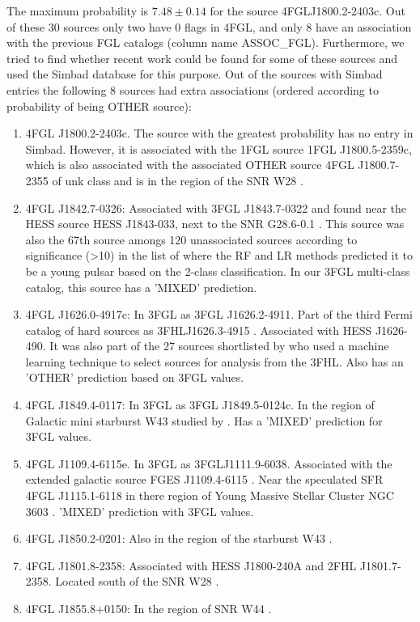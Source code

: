 The maximum probability is $7.48\pm0.14$ for the source 4FGLJ1800.2-2403c. Out of these 30 sources only two have 0 flags in 4FGL, and only 8 have an association with the previous FGL catalogs (column name ASSOC\_FGL). Furthermore, we tried to find whether recent work could be found for some of these sources and used the Simbad database for this purpose. Out of the sources with Simbad entries the following 8 sources had extra associations (ordered according to probability of being OTHER source):
\begin{enumerate}
\item 4FGL J1800.2-2403c. The source with the greatest probability has no entry in Simbad. However, it is associated with the 1FGL source 1FGL J1800.5-2359c, which is also associated with the associated OTHER source 4FGL J1800.7-2355 of unk class and is in the region of the SNR W28 \citep{2020MNRAS.495.2909R}.
\item 4FGL J1842.7-0326: Associated with 3FGL J1843.7-0322 and found near the HESS source HESS J1843-033, next to the SNR G28.6-0.1 \citep{2018A&A...612A...1H}. This source was also the 67th source amongs 120 unassociated sources according to significance (>10) in the list of \citet{2016ApJ...820....8S} where the RF and LR methods predicted it to be a young pulsar based on the 2-class classification. In our 3FGL multi-class catalog, this source has a 'MIXED' prediction.
\item 4FGL J1626.0-4917c: In 3FGL as 3FGL J1626.2-4911. Part of the third Fermi catalog of hard sources as 3FHLJ1626.3-4915 \citep{2017ApJS..232...18A}. Associated with HESS J1626-490. It was also part of the 27 sources shortlisted by \citet{2020MNRAS.495.1093H} who used a machine learning technique to select sources for analysis from the 3FHL. Also has an 'OTHER' prediction based on 3FGL values.
\item 4FGL J1849.4-0117: In 3FGL as 3FGL J1849.5-0124c. In the region of Galactic mini starburst W43 studied by \citet{2020A&A...640A..60Y}. Has a 'MIXED' prediction for 3FGL values.
\item 4FGL J1109.4-6115e. In 3FGL as 3FGLJ1111.9-6038. Associated with the extended galactic source FGES J1109.4-6115 \citep{2017ApJ...843..139A}. Near the speculated SFR 4FGL J1115.1-6118 in there region of  Young Massive Stellar Cluster NGC 3603 \citep{2020ApJ...897..131S}. 'MIXED' prediction with 3FGL values.
\item 4FGL J1850.2-0201: Also in the region of the starburst W43 \citep{2020A&A...640A..60Y}.
\item 4FGL J1801.8-2358: Associated with HESS J1800-240A and 2FHL J1801.7-2358. Located south of the SNR W28 \citep{2020MNRAS.495.2909R}.
\item 4FGL J1855.8+0150: In the region of SNR W44 \citep{2020ApJ...896L..23P}.
\end{enumerate}
